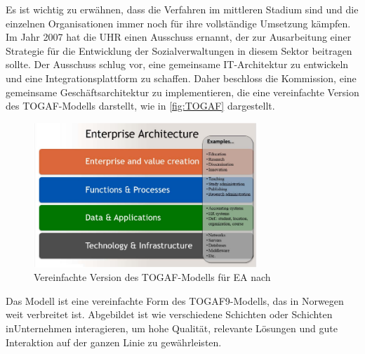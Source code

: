 \documentclass[
	doc,
	a4paper,
	helv
	]{apa6}
\begin{document}
Es ist  wichtig zu erwähnen, dass die Verfahren im mittleren Stadium sind und die einzelnen Organisationen immer noch für ihre vollständige Umsetzung kämpfen. Im Jahr 2007 hat die UHR einen Ausschuss  ernannt, der zur Ausarbeitung einer Strategie für die Entwicklung der Sozialverwaltungen in diesem Sektor beitragen sollte. Der Ausschuss schlug vor, eine gemeinsame IT-Architektur zu entwickeln und eine Integrationsplattform zu schaffen. Daher beschloss die Kommission, eine gemeinsame Geschäftsarchitektur zu implementieren, die eine vereinfachte Version des TOGAF-Modells darstellt, wie in \autoref{fig:TOGAF} dargestellt.

\begin{figure}[!htbp]
\begin{center}
\includegraphics[width=0.75\textwidth]{Abbildungen/ICT_NO.png}
\caption{Vereinfachte Version des TOGAF-Modells für EA nach \autocite{ICT2015}}
\label{fig:TOGAF}
\end{center}
\end{figure}

Das Modell ist eine vereinfachte Form des TOGAF9-Modells, das in Norwegen weit verbreitet ist. Abgebildet ist wie verschiedene Schichten oder Schichten inUnternehmen interagieren, um hohe Qualität, relevante Lösungen und gute Interaktion auf der ganzen Linie zu gewährleisten.
\end{document}
